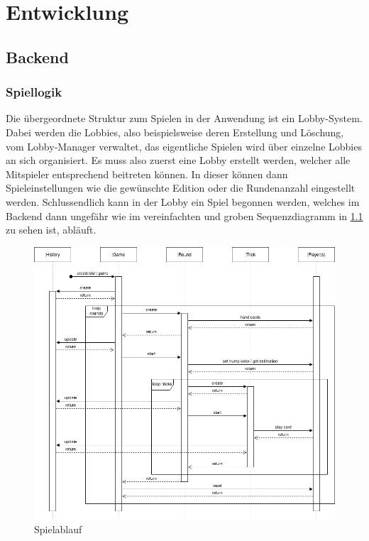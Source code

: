\chapter{Entwicklung}

\section{Backend}

\subsection{Spiellogik}

Die übergeordnete Struktur zum Spielen in der Anwendung ist ein Lobby-System. Dabei werden die Lobbies, also beispielsweise deren Erstellung und Löschung, vom Lobby-Manager verwaltet, das eigentliche Spielen wird über einzelne Lobbies an sich organisiert. Es muss also zuerst eine Lobby erstellt werden, welcher alle Mitspieler entsprechend beitreten können. In dieser können dann Spieleinstellungen wie die gewünschte Edition oder die Rundenanzahl eingestellt werden. Schlussendlich kann in der Lobby ein Spiel begonnen werden, welches im Backend dann ungefähr wie im vereinfachten und groben Sequenzdiagramm in \cref{fig:game-flow} zu sehen ist, abläuft.

\begin{figure}
	\includegraphics[width=\textwidth]{images/game-flow.png}
	\caption{Spielablauf}
	\label{fig:game-flow}
\end{figure}

